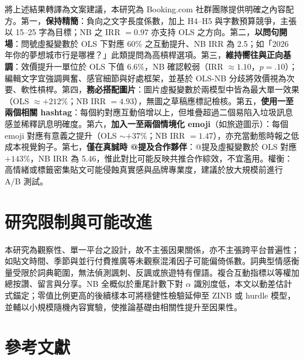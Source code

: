 \documentclass[12pt,a4paper]{ctexart}
\begin{document}
將上述結果轉譯為文案建議，本研究為 Booking.com 社群團隊提供明確之內容配方。第一，\textbf{保持精簡}：負向之文字長度係數，加上 H4--H5 與字數預算競爭，主張以 15--25 字為目標；NB 之 IRR $=0.97$ 亦支持 OLS 之方向。第二，\textbf{以問句開場}：問號虛擬變數於 OLS 下對應 60\% 之互動提升、NB IRR 為 2.5；如「2026 年你的夢想城市行是哪裡？」此類提問為高槓桿選項。第三，\textbf{維持嚮往與正向基調}：效價提升一單位於 OLS 下值 6.6\%，NB 確認較弱（IRR $\approx 1.10$，$p=.10$）；編輯文字宜強調興奮、感官細節與好處框架，並基於 OLS-NB 分歧將效價視為次要、軟性槓桿。第四，\textbf{務必搭配圖片}：圖片虛擬變數於兩模型中皆為最大單一效果（OLS $\approx +212\%$；NB IRR $=4.93$），無圖之草稿應標記檢核。第五，\textbf{使用一至兩個相關 hashtag}：每個約對應互動倍增以上，但堆疊超過二個易陷入垃圾訊息感並稀釋訊息明確度。第六，\textbf{加入一至兩個情境化 emoji}（如旅遊圖示）：每個 emoji 對應有意義之提升（OLS $\sim+37\%$；NB IRR $=1.47$），亦充當動態時報之低成本視覺鉤子。第七，\textbf{僅在真誠時 @提及合作夥伴}：@提及虛擬變數於 OLS 對應 $+143\%$，NB IRR 為 5.46，惟此對比可能反映共推合作綜效，不宜濫用。權衡：高情緒或標籤密集貼文可能侵蝕真實感與品牌專業度，建議於放大規模前進行 A/B 測試。

\section{研究限制與可能改進}

本研究為觀察性、單一平台之設計，故不主張因果關係，亦不主張跨平台普遍性；如貼文時間、季節與並行付費推廣等未觀察混淆因子可能偏倚係數。詞典型情感衡量受限於詞典範圍，無法偵測諷刺、反諷或旅遊特有俚語。複合互動指標以等權加總按讚、留言與分享。NB 全概似於重尾計數下對 $\alpha$ 識別度低，本文以動差估計式錨定；零值比例更高的後續樣本可將穩健性檢驗延伸至 ZINB 或 hurdle 模型，並輔以小規模隨機內容實驗，使推論基礎由相關性提升至因果性。

\section*{參考文獻}
\end{document}
